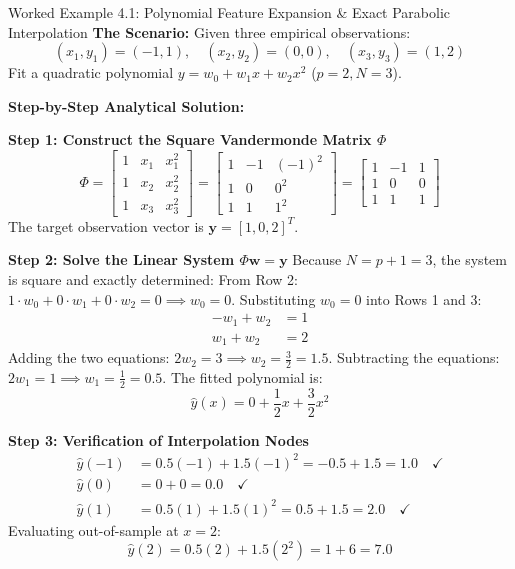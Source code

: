 \begin{examplebox}{Worked Example 4.1: Polynomial Feature Expansion \& Exact Parabolic Interpolation}
\label{ex:w04_poly_interpolation}
\textbf{The Scenario:}
Given three empirical observations:
\begin{equation*}
(x_1, y_1) = (-1, 1), \quad (x_2, y_2) = (0, 0), \quad (x_3, y_3) = (1, 2)
\end{equation*}
Fit a quadratic polynomial $y = w_0 + w_1 x + w_2 x^2$ ($p = 2, N = 3$).

\tcblower
\textbf{Step-by-Step Analytical Solution:}

\textbf{Step 1: Construct the Square Vandermonde Matrix $\Phi$}
\begin{equation*}
\Phi = \begin{bmatrix} 1 & x_1 & x_1^2 \\ 1 & x_2 & x_2^2 \\ 1 & x_3 & x_3^2 \end{bmatrix} = \begin{bmatrix} 1 & -1 & (-1)^2 \\ 1 & 0 & 0^2 \\ 1 & 1 & 1^2 \end{bmatrix} = \begin{bmatrix} 1 & -1 & 1 \\ 1 & 0 & 0 \\ 1 & 1 & 1 \end{bmatrix}
\end{equation*}
The target observation vector is $\mathbf{y} = [1, 0, 2]^T$.

\textbf{Step 2: Solve the Linear System $\Phi \mathbf{w} = \mathbf{y}$}
Because $N = p + 1 = 3$, the system is square and exactly determined:
From Row 2: $1 \cdot w_0 + 0 \cdot w_1 + 0 \cdot w_2 = 0 \implies w_0 = 0$.
Substituting $w_0 = 0$ into Rows 1 and 3:
\begin{align*}
-w_1 + w_2 &= 1 \\
w_1 + w_2 &= 2
\end{align*}
Adding the two equations: $2w_2 = 3 \implies w_2 = \frac{3}{2} = 1.5$.
Subtracting the equations: $2w_1 = 1 \implies w_1 = \frac{1}{2} = 0.5$.
The fitted polynomial is:
\begin{equation*}
\hat{y}(x) = 0 + \frac{1}{2}x + \frac{3}{2}x^2
\end{equation*}

\textbf{Step 3: Verification of Interpolation Nodes}
\begin{align*}
\hat{y}(-1) &= 0.5(-1) + 1.5(-1)^2 = -0.5 + 1.5 = 1.0 \quad \checkmark \\
\hat{y}(0) &= 0 + 0 = 0.0 \quad \checkmark \\
\hat{y}(1) &= 0.5(1) + 1.5(1)^2 = 0.5 + 1.5 = 2.0 \quad \checkmark
\end{align*}
Evaluating out-of-sample at $x = 2$:
\begin{equation*}
\hat{y}(2) = 0.5(2) + 1.5(2^2) = 1 + 6 = \mathbf{7.0}
\end{equation*}
\end{examplebox}

